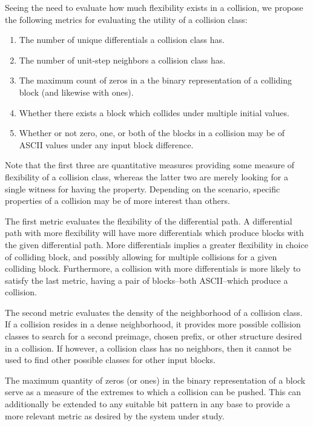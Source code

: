 \documentclass[conference]{IEEEtran}
\begin{document}
Seeing the need to evaluate how much flexibility exists in a collision,
we propose the following metrics for evaluating the utility of a collision
class:
\begin{enumerate}
    \item The number of unique differentials a collision class has.
    \item The number of unit-step neighbors a collision class has.
    \item The maximum count of zeros in a the binary representation of a
        colliding block (and likewise with ones).
    \item Whether there exists a block which collides under multiple initial
        values.
    \item Whether or not zero, one, or both of the blocks in a collision may
        be of ASCII values under any input block difference.
\end{enumerate}
Note that the first three are quantitative measures providing some measure of
flexibility of a collision class, whereas the latter two are merely looking
for a single witness for having the property. Depending on the scenario,
specific properties of a collision may be of more interest than others.

The first metric evaluates the flexibility of the differential path. A
differential path with more flexibility will have more differentials which
produce blocks with the given differential path. More differentials implies
a greater flexibility in choice of colliding block, and possibly allowing
for multiple collisions for a given colliding block. Furthermore, a collision
with more differentials is more likely to satisfy the last metric, having a
pair of blocks--both ASCII--which produce a collision.

The second metric evaluates the density of the neighborhood of a collision
class. If a collision resides in a dense neighborhood, it provides more
possible collision classes to search for a second preimage, chosen prefix, or
other structure desired in a collision. If however, a collision class has no
neighbors, then it cannot be used to find other possible classes for other
input blocks.

The maximum quantity of zeros (or ones) in the binary representation of a
block serve as a measure of the extremes to which a collision can be pushed.
This can additionally be extended to any suitable bit pattern in any base to
provide a more relevant metric as desired by the system under study.
\end{document}
